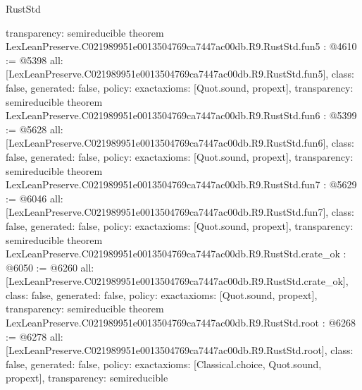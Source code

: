 \begin{lexlean}{RustStd}
\begin{coremodule}
{  transparency: semireducible
}
theorem LexLeanPreserve.C021989951e0013504769ca7447ac00db.R9.RustStd.fun5 : @4610 := @5398 {
  all: [LexLeanPreserve.C021989951e0013504769ca7447ac00db.R9.RustStd.fun5],
  class: false,
  generated: false,
  policy: exact{axioms: [Quot.sound, propext]},
  transparency: semireducible
}
theorem LexLeanPreserve.C021989951e0013504769ca7447ac00db.R9.RustStd.fun6 : @5399 := @5628 {
  all: [LexLeanPreserve.C021989951e0013504769ca7447ac00db.R9.RustStd.fun6],
  class: false,
  generated: false,
  policy: exact{axioms: [Quot.sound, propext]},
  transparency: semireducible
}
theorem LexLeanPreserve.C021989951e0013504769ca7447ac00db.R9.RustStd.fun7 : @5629 := @6046 {
  all: [LexLeanPreserve.C021989951e0013504769ca7447ac00db.R9.RustStd.fun7],
  class: false,
  generated: false,
  policy: exact{axioms: [Quot.sound, propext]},
  transparency: semireducible
}
theorem LexLeanPreserve.C021989951e0013504769ca7447ac00db.R9.RustStd.crate_ok : @6050 := @6260 {
  all: [LexLeanPreserve.C021989951e0013504769ca7447ac00db.R9.RustStd.crate_ok],
  class: false,
  generated: false,
  policy: exact{axioms: [Quot.sound, propext]},
  transparency: semireducible
}
theorem LexLeanPreserve.C021989951e0013504769ca7447ac00db.R9.RustStd.root : @6268 := @6278 {
  all: [LexLeanPreserve.C021989951e0013504769ca7447ac00db.R9.RustStd.root],
  class: false,
  generated: false,
  policy: exact{axioms: [Classical.choice, Quot.sound, propext]},
  transparency: semireducible
}


\end{coremodule}
\end{lexlean}
